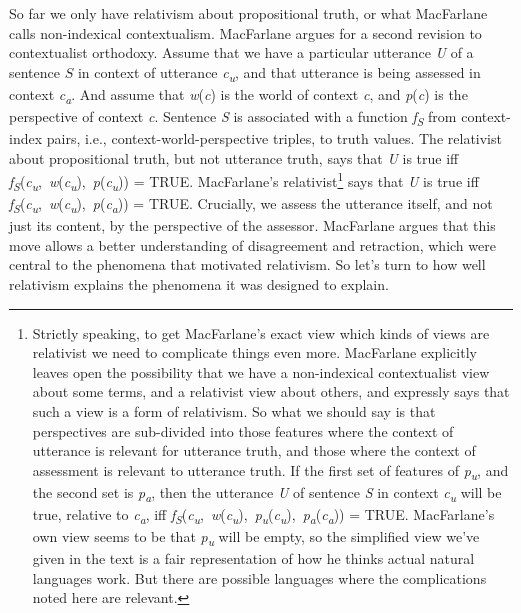 \documentclass[
  10pt,
  letterpaper,
  DIV=11,
  numbers=noendperiod,
  twoside]{scrartcl}
\begin{document}
So far we only have relativism about propositional truth, or what
MacFarlane calls non-indexical contextualism. MacFarlane argues for a
second revision to contextualist orthodoxy. Assume that we have a
particular utterance \emph{U} of a sentence \(S\) in context of
utterance \emph{c\textsubscript{u}}, and that utterance is being
assessed in context \emph{c\textsubscript{a}}. And assume that
\emph{w}(\emph{c}) is the world of context \emph{c}, and
\emph{p}(\emph{c}) is the perspective of context \emph{c}. Sentence
\emph{S} is associated with a function \emph{f\textsubscript{S}} from
context-index pairs, i.e., context-world-perspective triples, to truth
values. The relativist about propositional truth, but not utterance
truth, says that \emph{U} is true iff
\emph{f\textsubscript{S}}(\emph{c\textsubscript{u}},~\emph{w}(\emph{c\textsubscript{u}}),~\emph{p}(\emph{c\textsubscript{u}}))
= TRUE. MacFarlane's relativist\footnote{Strictly speaking, to get
  MacFarlane's exact view which kinds of views are relativist we need to
  complicate things even more. MacFarlane explicitly leaves open the
  possibility that we have a non-indexical contextualist view about some
  terms, and a relativist view about others, and expressly says that
  such a view is a form of relativism. So what we should say is that
  perspectives are sub-divided into those features where the context of
  utterance is relevant for utterance truth, and those where the context
  of assessment is relevant to utterance truth. If the first set of
  features of \emph{p\textsubscript{u}}, and the second set is
  \emph{p\textsubscript{a}}, then the utterance \emph{U} of sentence
  \emph{S} in context \emph{c\textsubscript{u}} will be true, relative
  to \emph{c\textsubscript{a}}, iff
  \emph{f\textsubscript{S}}(\emph{c\textsubscript{u}},~\emph{w}(\emph{c\textsubscript{u}}),~\emph{p\textsubscript{u}}(\emph{c\textsubscript{u}}),~\emph{p\textsubscript{a}}(\emph{c\textsubscript{a}}))
  = TRUE. MacFarlane's own view seems to be that
  \emph{p\textsubscript{u}} will be empty, so the simplified view we've
  given in the text is a fair representation of how he thinks actual
  natural languages work. But there are possible languages where the
  complications noted here are relevant.} says that \emph{U} is true iff
\emph{f\textsubscript{S}}(\emph{c\textsubscript{u}},~\emph{w}(\emph{c\textsubscript{u}}),~\emph{p}(\emph{c\textsubscript{a}}))
= TRUE. Crucially, we assess the utterance itself, and not just its
content, by the perspective of the assessor. MacFarlane argues that this
move allows a better understanding of disagreement and retraction, which
were central to the phenomena that motivated relativism. So let's turn
to how well relativism explains the phenomena it was designed to
explain.
\end{document}
